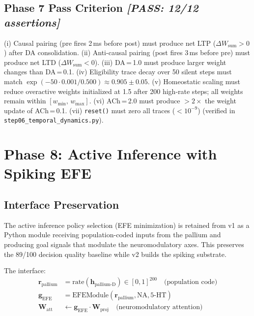 \documentclass[11pt,a4paper]{article}
\begin{document}
\subsection{Phase 7 Pass Criterion \textit{[PASS: 12/12 assertions]}}

(i) Causal pairing (pre fires 2\,ms before post) must produce net LTP
($\Delta W_\text{sum} > 0$) after DA consolidation.
(ii) Anti-causal pairing (post fires 3\,ms before pre) must produce net LTD
($\Delta W_\text{sum} < 0$).
(iii) DA\,=\,1.0 must produce larger weight changes than DA\,=\,0.1.
(iv) Eligibility trace decay over 50 silent steps must match
$\exp(-50 \cdot 0.001 / 0.500) \approx 0.905 \pm 0.05$.
(v) Homeostatic scaling must reduce overactive weights initialized at 1.5
after 200 high-rate steps; all weights remain within $[w_{\min},\, w_{\max}]$.
(vi) ACh\,=\,2.0 must produce $>2\times$ the weight update of ACh\,=\,0.1.
(vii) \texttt{reset()} must zero all traces ($< 10^{-9}$)
(verified in \texttt{step06\_temporal\_dynamics.py}).

\section{Phase 8: Active Inference with Spiking EFE}\label{sec:phase8}

\subsection{Interface Preservation}

The active inference policy selection (EFE minimization) is retained
from v1 as a Python module receiving population-coded inputs from the
pallium and producing goal signals that modulate the neuromodulatory axes.
This preserves the 89/100 decision quality baseline while v2 builds
the spiking substrate.

The interface:
\begin{equation}\label{eq:ai_interface}
\begin{aligned}
  \mathbf{r}_\text{pallium} &= \text{rate}(\mathbf{h}_\text{pallium-D}) \in [0,1]^{200}
    \quad\text{(population code)} \\
  \mathbf{g}_\text{EFE} &= \text{EFEModule}(\mathbf{r}_\text{pallium}, \text{NA}, \text{5-HT}) \\
  \mathbf{W}_\text{att} &\leftarrow \mathbf{g}_\text{EFE} \cdot \mathbf{W}_\text{proj}
    \quad\text{(neuromodulatory attention)} \\
\end{aligned}
\end{equation}
\end{document}
